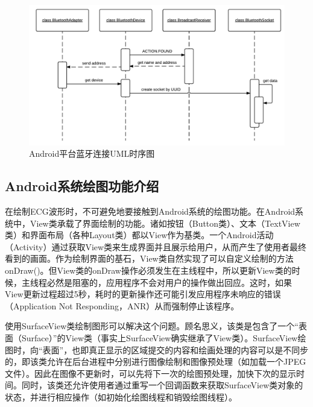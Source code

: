 \begin{figure}[htbp]
 \centering
        \includegraphics[width=0.9\columnwidth]{fig2-2.png}
        \caption{
                \label{fig2-2}
                Android平台蓝牙连接UML时序图
        }
\end{figure}

\subsection{Android系统绘图功能介绍}

在绘制ECG波形时，不可避免地要接触到Android系统的绘图功能。在Android系统中，View类承载了界面绘制的功能。诸如按钮（Button类）、文本（TextView类）和界面布局（各种Layout类）都以View作为基类。一个Android活动（Activity）通过获取View类来生成界面并且展示给用户，从而产生了使用者最终看到的画面。作为绘制界面的基石，View类自然实现了可以自定义绘制的方法onDraw()。但View类的onDraw操作必须发生在主线程中，所以更新View类的时候，主线程必然是阻塞的，应用程序不会对用户的操作做出回应。这时，如果View更新过程超过5秒，耗时的更新操作还可能引发应用程序未响应的错误（Application Not Responding，ANR）从而强制停止该程序。

使用SurfaceView类绘制图形可以解决这个问题。顾名思义，该类是包含了一个“表面（Surface）”的View类（事实上SurfaceView确实继承了View类）。SurfaceView绘图时，向“表面”，也即真正显示的区域提交的内容和绘画处理的内容可以是不同步的，即该类允许在后台进程中分别进行图像绘制和图像预处理（如加载一个JPEG文件）。因此在图像不更新时，可以先将下一次的绘图预处理，加快下次的显示时间。同时，该类还允许使用者通过重写一个回调函数来获取SurfaceView类对象的状态，并进行相应操作（如初始化绘图线程和销毁绘图线程）。

